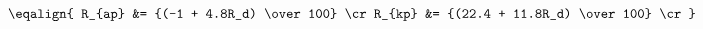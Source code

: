 \hsize 0pt
\vsize 0pt
\nopagenumbers
\overfullrule 0pt
\noindent
$$
\eqalign{
R_{ap} &= {(-1 + 4.8R_d) \over 100} \cr
R_{kp} &= {(22.4 + 11.8R_d) \over 100} \cr
}
$$
\bye